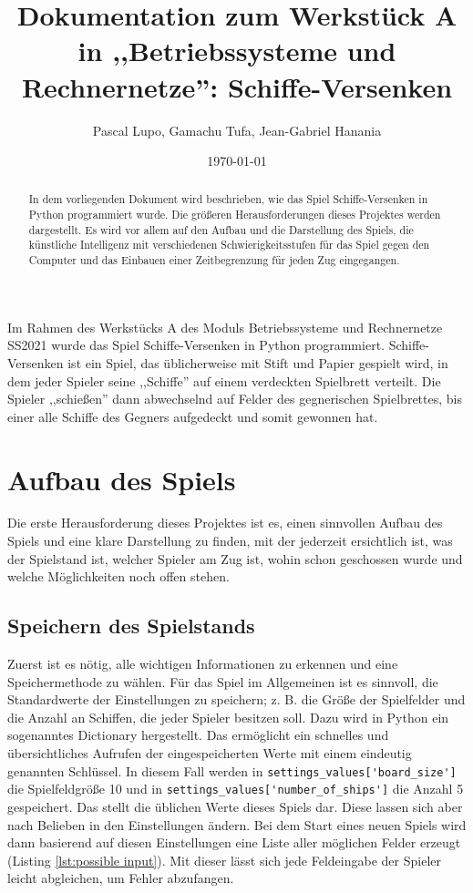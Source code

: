 \documentclass{article}
\title{Dokumentation zum Werkstück A in ,,Betriebssysteme und Rechnernetze'': Schiffe-Versenken}
\author{Pascal Lupo, Gamachu Tufa, Jean-Gabriel Hanania}
\date{\today}
\begin{document}
\maketitle
\thispagestyle{empty} %

\begin{abstract}
    In dem vorliegenden Dokument wird beschrieben, wie das Spiel Schiffe-Versenken in Python programmiert wurde. Die größeren Herausforderungen dieses Projektes werden dargestellt. Es wird vor allem auf den Aufbau und die Darstellung des Spiels, die künstliche Intelligenz mit verschiedenen Schwierigkeitsstufen für das Spiel gegen den Computer und das Einbauen einer Zeitbegrenzung für jeden Zug eingegangen.
\end{abstract}

\section*{}
    Im Rahmen des Werkstücks A des Moduls Betriebssysteme und Rechnernetze SS2021 wurde das Spiel Schiffe-Versenken in Python programmiert. Schiffe-Versenken ist ein Spiel, das üblicherweise mit Stift und Papier gespielt wird, in dem jeder Spieler seine ,,Schiffe'' auf einem verdeckten Spielbrett verteilt. Die Spieler ,,schießen'' dann abwechselnd auf Felder des gegnerischen Spielbrettes, bis einer alle Schiffe des Gegners aufgedeckt und somit gewonnen hat.


\section{Aufbau des Spiels}
    Die erste Herausforderung dieses Projektes ist es, einen sinnvollen Aufbau des Spiels und eine klare Darstellung zu finden, mit der jederzeit ersichtlich ist, was der Spielstand ist, welcher Spieler am Zug ist, wohin schon geschossen wurde und welche Möglichkeiten noch offen stehen.

\subsection{Speichern des Spielstands}
    Zuerst ist es nötig, alle wichtigen Informationen zu erkennen und eine Speichermethode zu wählen. Für das Spiel im Allgemeinen ist es sinnvoll, die Standardwerte der Einstellungen zu speichern; z. B. die Größe der Spielfelder und die Anzahl an Schiffen, die jeder Spieler besitzen soll. Dazu wird in Python ein sogenanntes Dictionary hergestellt. Das ermöglicht ein schnelles und übersichtliches Aufrufen der eingespeicherten Werte mit einem eindeutig genannten Schlüssel. In diesem Fall werden in \verb$settings_values['board_size']$ die Spielfeldgröße 10 und in \verb$settings_values['number_of_ships']$ die Anzahl 5 gespeichert. Das stellt die üblichen Werte dieses Spiels dar. Diese lassen sich aber nach Belieben in den Einstellungen ändern. Bei dem Start eines neuen Spiels wird dann basierend auf diesen Einstellungen eine Liste aller möglichen Felder erzeugt (Listing \ref{lst:possible input}). Mit dieser lässt sich jede Feldeingabe der Spieler leicht abgleichen, um Fehler abzufangen.
\end{document}

